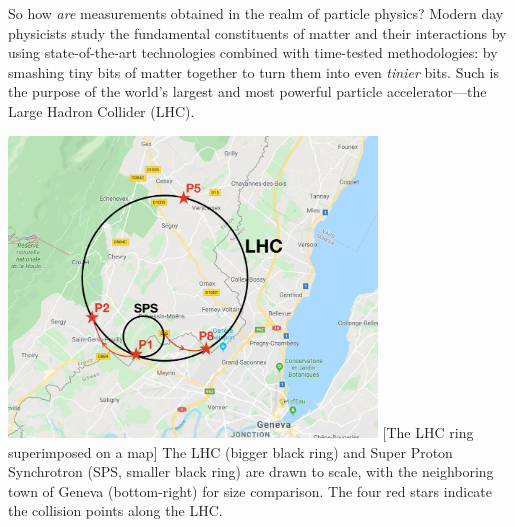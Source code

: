 So how \emph{are} measurements obtained in the realm of particle physics?
Modern day physicists study the fundamental constituents of matter and their interactions by using state-of-the-art technologies combined with time-tested methodologies:
by smashing tiny bits of matter together to turn them into even \emph{tinier} bits.
Such is the purpose of the world's largest and most powerful particle accelerator---the Large Hadron Collider (LHC).
\begin{multiFigure}
    \centering
        \includegraphics[height=8cm]{figures/lhc/lhc_drawn_on_map_withpoints.png}
        [The LHC ring superimposed on a map]
        {The LHC (bigger black ring) and Super Proton Synchrotron (SPS, smaller black ring) are drawn to scale, with the neighboring town of Geneva (bottom-right) for size comparison. 
        The four red stars indicate the \pp collision points along the LHC.}
    \label{fig:lhc_on_map}
\end{multiFigure}

